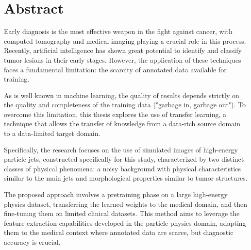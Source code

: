 \chapter*{Abstract}


Early diagnosis is the most effective weapon in the fight against cancer, with computed tomography and medical imaging playing a crucial role in this process. Recently, artificial intelligence has shown great potential to identify and classify tumor lesions in their early stages. However, the application of these techniques faces a fundamental limitation: the scarcity of annotated data available for training.

As is well known in machine learning, the quality of results depends strictly on the quality and completeness of the training data ("garbage in, garbage out"). To overcome this limitation, this thesis explores the use of transfer learning, a technique that allows the transfer of knowledge from a data-rich source domain to a data-limited target domain.

Specifically, the research focuses on the use of simulated images of high-energy particle jets, constructed specifically for this study, characterized by two distinct classes of physical phenomena: a noisy background with physical characteristics similar to the main jets and morphological properties similar to tumor structures.

The proposed approach involves a pretraining phase on a large high-energy physics dataset, transferring the learned weights to the medical domain, and then fine-tuning them on limited clinical datasets. This method aims to leverage the feature extraction capabilities developed in the particle physics domain, adapting them to the medical context where annotated data are scarce, but diagnostic accuracy is crucial.
